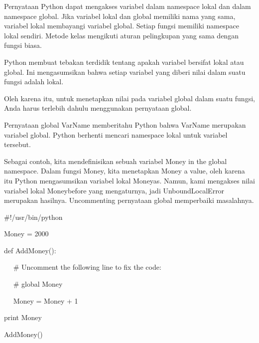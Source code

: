 \noindent 
Pernyataan Python dapat mengakses variabel dalam namespace lokal dan dalam namespace global. Jika variabel lokal dan global memiliki nama yang sama, variabel lokal membayangi variabel global. Setiap fungsi memiliki namespace lokal sendiri. Metode kelas mengikuti aturan pelingkupan yang sama dengan fungsi biasa. \par
\noindent 
Python membuat tebakan terdidik tentang apakah variabel bersifat lokal atau global. Ini mengasumsikan bahwa setiap variabel yang diberi nilai dalam suatu fungsi adalah lokal. \par
\noindent 
Oleh karena itu, untuk menetapkan nilai pada variabel global dalam suatu fungsi, Anda harus terlebih dahulu menggunakan pernyataan global. \par
\noindent 
Pernyataan global VarName memberitahu Python bahwa VarName merupakan variabel global. Python berhenti mencari namespace lokal untuk variabel tersebut. \par
\noindent 
Sebagai contoh, kita mendefinisikan sebuah variabel Money in the global namespace. Dalam fungsi Money, kita menetapkan Money a value, oleh karena itu Python mengasumsikan variabel lokal Moneyas. Namun, kami mengakses nilai variabel lokal Moneybefore yang mengaturnya, jadi UnboundLocalError merupakan hasilnya. Uncommenting pernyataan global memperbaiki masalahnya. \par
\noindent 
 \hspace*{0.5in}  $  \#  $!/usr/bin/python \par
\vspace{12pt}
\noindent 
 \hspace*{0.5in} Money = 2000 \par
\noindent 
 \hspace*{0.5in} def AddMoney(): \par
\noindent 
 \hspace*{0.5in} ~~  $  \#  $ Uncomment the following line to fix the code: \par
\noindent 
 \hspace*{0.5in} ~~  $  \#  $ global Money \par
\noindent 
 \hspace*{0.5in} ~~ Money = Money + 1 \par
\vspace{12pt}
\noindent 
 \hspace*{0.5in} print Money \par
\noindent 
 \hspace*{0.5in} AddMoney() \par
